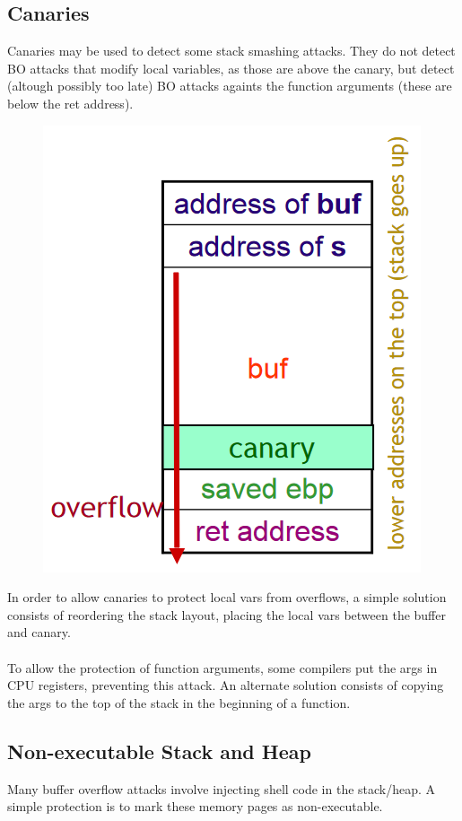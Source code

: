 \documentclass[10pt,a4paper]{report}
\begin{document}
\subsection{Canaries}
Canaries may be used to detect some stack smashing attacks. They do not detect BO attacks that modify local variables, as those are above the canary, but detect (altough possibly too late) BO attacks againts the function arguments (these are below the ret address).
\begin{figure}[H]
\centering
\includegraphics[scale=0.4]{15.png}
\end{figure}
In order to allow canaries to protect local vars from overflows, a simple solution consists of reordering the stack layout, placing the local vars between the buffer and canary.\\
\\
To allow the protection of function arguments, some compilers put the args in CPU registers, preventing this attack. An alternate solution consists of copying the args to the top of the stack in the beginning of a function.
\subsection{Non-executable Stack and Heap}
Many buffer overflow attacks involve injecting shell code in the stack/heap. A simple protection is to mark these memory pages as non-executable.
\end{document}
